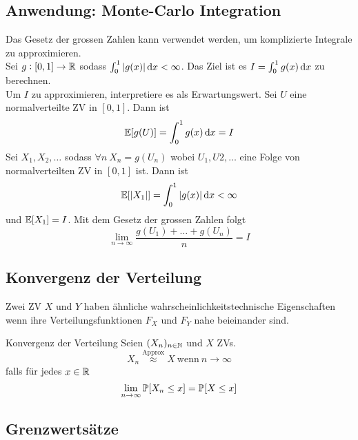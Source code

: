 \subsection{Anwendung: Monte-Carlo Integration}%
\label{sub:anwendung_monte_carlo_integration}



Das Gesetz der grossen Zahlen kann verwendet werden, um komplizierte Integrale zu approximieren.\\
Sei $g : [0,1] \rightarrow \mathbb{R}$ sodass $\int_{0}^{1} |g(x)| \dif x < \infty$. Das Ziel ist es $I = \int_{0}^{1} g(x) \dif
x$ zu berechnen.\\
Um $I$ zu approximieren, interpretiere es als Erwartungswert. Sei $U$ eine normalverteilte ZV in $[0,1]$. Dann ist
\begin{equation*}
	\E [g(U)] = \int_{0}^{1} g(x) \dif x = I
\end{equation*}
Sei $X_1 , X_2 , \ldots$ \iid sodass $\forall n ~ X_n = g(U_n)$ wobei $U_1 , U2 , \ldots$ eine Folge von \iid
normalverteilten ZV in $[0,1]$ ist. Dann ist
\begin{equation*}
	\E [|X_1|] = \int_{0}^{1} |g(x)| \dif x < \infty
\end{equation*}
und $\mathbb{E} [X_1] = I$. Mit dem Gesetz der grossen Zahlen folgt
\begin{equation*}
	\lim_{n \rightarrow \infty} \frac{g(U_1) + \ldots + g (U_n)}{n} = I
\end{equation*}


\subsection{Konvergenz der Verteilung}%
\label{sub:konvergenz_der_verteilung}

Zwei ZV $X$ und $Y$ haben ähnliche wahrscheinlichkeitstechnische Eigenschaften wenn ihre Verteilungsfunktionen $F_X$ und
$F_Y$ nahe beieinander sind.
\begin{definition}{Konvergenz der Verteilung}
	Seien $(X_n)_{n \in \mathbb{N}}$ und $X$ ZVs. 
	\begin{equation*}
		X_n \overset{\text{Approx}}{\approx} X ~\text{wenn} ~ n \rightarrow \infty
	\end{equation*}
	falls für jedes $x \in \mathbb{R}$
	\begin{equation*}
		\lim_{n \rightarrow \infty} \mathbb{P} [X_n \leq x] = \mathbb{P} [X \leq x]
	\end{equation*}
\end{definition}
\subsection{Grenzwertsätze}%
\label{sub:grenzwertsaetze}

